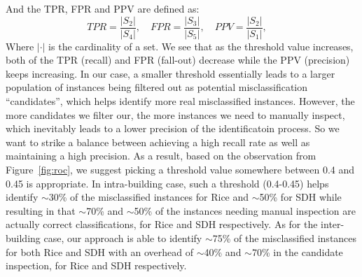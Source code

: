 And the TPR, FPR and PPV are defined as: 
\begin{displaymath}
TPR = \frac{|S_{2}|}{|S_{4}|},\quad
FPR = \frac{|S_{3}|}{|S_{5}|},\quad
PPV = \frac{|S_{2}|}{|S_{1}|},\quad
\end{displaymath}
Where $|\cdot|$ is the cardinality of a set. We see that as the threshold value increases, both of the TPR (recall) and FPR (fall-out) decrease while the PPV (precision) keeps increasing. 
In our case, a smaller threshold essentially leads to a larger population of instances being filtered out as potential misclassification ``candidates'', which helps identify more real 
misclassified instances. However, the more candidates we filter our, the more instances we need to manually inspect, which inevitably leads to a lower precision of the identificatoin process. 
So we want to strike a balance between achieving a high recall rate as well as maintaining a high precision. As a result, based on the observation from Figure~\ref{fig:roc}, we suggest 
picking a threshold value somewhere between 0.4 and 0.45 is appropriate. In intra-building case, such a threshold (0.4-0.45) helps identify $\sim$30\% of the misclassified instances for 
Rice and $\sim$50\% for SDH while resulting in that $\sim$70\% and $\sim$50\% of the instances needing manual inspection are actually correct classifications, for Rice and SDH respectively. 
As for the inter-building case, our approach is able to identify $\sim$75\% of the misclassified instances for both Rice and SDH with an overhead of $\sim$40\% and $\sim$70\% in the candidate inspection, for Rice and SDH respectively.

